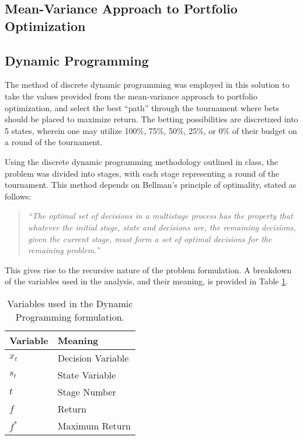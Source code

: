\documentclass[12pt]{article}
\begin{document}
\subsection{Mean-Variance Approach to Portfolio Optimization}

\subsection{Dynamic Programming}
The method of discrete dynamic programming was employed in this solution to take the values provided from the mean-variance approach to portfolio optimization, and select the best ``path'' through the tournament where bets should be placed to maximize return.
The betting possibilities are discretized into 5 states, wherein one may utilize 100\%, 75\%, 50\%, 25\%, or 0\% of their budget on a round of the tournament.

Using the discrete dynamic programming methodology outlined in class, the problem was divided into stages, with each stage representing a round of the tournament.
This method depends on Bellman's principle of optimality, stated as follows:
\begin{quote}
\emph{``The optimal set of decisions in a multistage process has the property that whatever the initial stage, state and decisions are, the remaining decisions, given the current stage, must form a set of optimal decisions for the remaining problem.''}
\end{quote}
This gives rise to the recursive nature of the problem formulation.
A breakdown of the variables used in the analysis, and their meaning, is provided in Table \ref{dp_vars}. \\

\begin{table}[htbp!]
\begin{centering}
    \begin{tabular}{|l|l|}
    \hline
    Variable & Meaning           \\ \hline
    $x_{t}$        & Decision Variable \\ \hline
    $s_{t}$        & State Variable    \\ \hline
    $t$        & Stage Number             \\ \hline
    $f$        & Return            \\ \hline
    $f^{*}$       & Maximum Return    \\ \hline
    \end{tabular}
    \label{dp_vars}
    \caption{Variables used in the Dynamic Programming formulation.}
\end{centering}
\end{table}
\end{document}
